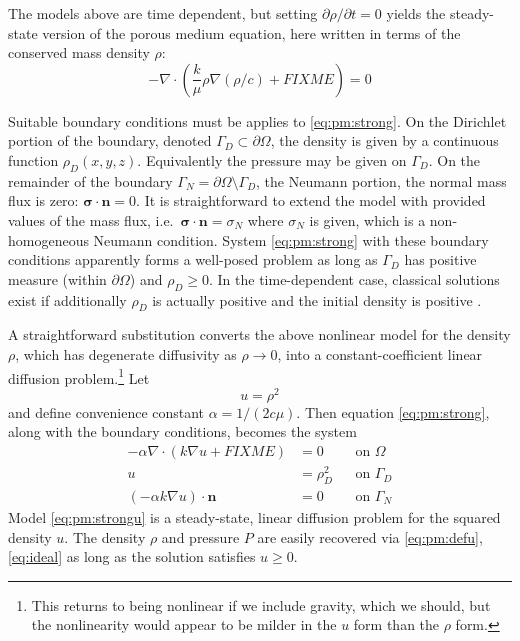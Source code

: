 \documentclass[11pt]{amsart}
\newcommand{\bn}{\mathbf{n}}
\newcommand{\bsigma}{\bm{\sigma}}
\newcommand{\Div}{\nabla\cdot}
\newcommand{\grad}{\nabla}
\begin{document}
The models above are time dependent, but setting $\partial \rho/\partial t = 0$ yields the steady-state version of the porous medium equation, here written in terms of the conserved mass density $\rho$:
\begin{equation}
- \Div\left(\frac{k}{\mu} \rho \grad\left(\rho/c\right) + FIXME\right) = 0
\label{eq:pm:strong}
\end{equation}

Suitable boundary conditions must be applies to \eqref{eq:pm:strong}.  On the Dirichlet portion of the boundary, denoted $\Gamma_D \subset \partial\Omega$, the density is given by a continuous function $\rho_D(x,y,z)$.  Equivalently the pressure may be given on $\Gamma_D$.  On the remainder of the boundary $\Gamma_N = \partial\Omega \setminus \Gamma_D$, the Neumann portion, the normal mass flux is zero: $\bsigma\cdot \bn = 0$.  It is straightforward to extend the model with provided values of the mass flux, i.e.~$\bsigma\cdot \bn = \sigma_N$ where $\sigma_N$ is given, which is a non-homogeneous Neumann condition.  System \eqref{eq:pm:strong} with these boundary conditions apparently forms a well-posed problem as long as $\Gamma_D$ has positive measure (within $\partial\Omega$) and $\rho_D\ge 0$.  In the time-dependent case, classical solutions exist if additionally $\rho_D$ is actually positive and the initial density is positive \citep[Theorem 3.1]{Vazquez2007}.

A straightforward substitution converts the above nonlinear model for the density $\rho$, which has degenerate diffusivity as $\rho \to 0$, into a constant-coefficient linear diffusion problem.\footnote{This returns to being nonlinear if we include gravity, which we should, but the nonlinearity would appear to be milder in the $u$ form than the $\rho$ form.}  Let
\begin{equation}
u = \rho^2 \label{eq:pm:defu}
\end{equation}
and define convenience constant $\alpha = 1/(2c\mu)$.  Then equation \eqref{eq:pm:strong}, along with the boundary conditions, becomes the system
\begin{subequations}
\label{eq:pm:strongu}
\begin{align}
- \alpha \Div\left(k \grad u + FIXME\right) &= 0 & &\text{on } \Omega \label{eq:pm:strongu:eqn} \\
u &= \rho_D^2 & &\text{on } \Gamma_D  \label{eq:pm:strongu:bcD} \\
\left(-\alpha k \grad u\right) \cdot \bn &= 0 & &\text{on } \Gamma_N  \label{eq:pm:strongu:bcN} 
\end{align}
\end{subequations}
Model \eqref{eq:pm:strongu} is a steady-state, linear diffusion problem for the squared density $u$.  The density $\rho$ and pressure $P$ are easily recovered via \eqref{eq:pm:defu}, \eqref{eq:ideal} as long as the solution satisfies $u\ge 0$.
\end{document}
